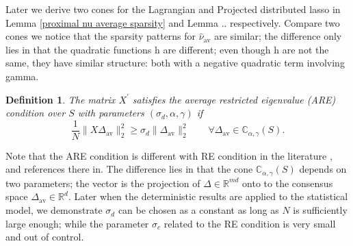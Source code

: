 \documentclass{article}
\theoremstyle{break}
\newtheorem{definition}{Definition}
\begin{document}
Later we derive two cones for the Lagrangian and Projected distributed lasso in Lemma \ref{proximal nu average sparsity} and Lemma .. respectively. Compare two cones we notice that the sparsity patterns for $\hat{\nu}_{\text{av}}$ are similar; the difference only lies in that the quadratic functions h are different; even though h are not the same, they have similar structure: both with a negative quadratic term involving gamma.
\begin{definition}
  The matrix $X^{'}$ satisfies the average restricted eigenvalue 
 (ARE) condition over $S$ with parameters $(\sigma_d,\alpha,\gamma)$ if 
\begin{equation}\label{AVE}
    \frac{1}{N}\lVert X\Delta_{\text{av}}\rVert_2^2\geq \sigma_d\lVert\Delta_{\text{av}}\rVert_2^2\qquad \forall \Delta_{\text{av}}\in\mathbb{C}_{\alpha,\gamma}(S).
\end{equation}
\end{definition}

Note that the ARE condition is different with RE condition in the literature \cite{Ras}, \cite{Bickel_2009} and references there in. The difference lies in that the cone $\mathbb{C}_{\alpha,\gamma}(S)$ depends on two parameters; the vector is the projection of $\Delta\in\mathbb{R}^{m d}$ onto to the consensus space $\Delta_{
\text{av}}\in\mathbb{R}^d.$  Later when the deterministic results are applied to the statistical model, we demonstrate  $\sigma_d$ can be chosen as a constant as long as $N$ is sufficiently large enough; while the parameter $\sigma_c$ related to the RE condition is very small and out of control.
\end{document}
